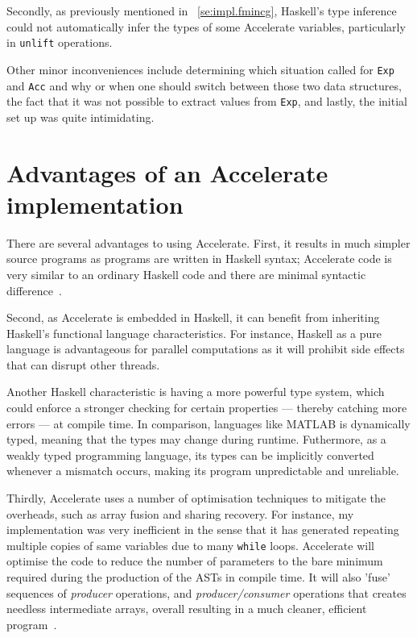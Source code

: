 Secondly, as previously mentioned in ~\ref{se:impl.fmincg}, Haskell's type inference could not automatically infer the types of some Accelerate variables, particularly in \texttt{unlift} operations. 

Other minor inconveniences include determining which situation called for \texttt{Exp} and \texttt{Acc} and why or when one should switch between those two data structures, the fact that it was not possible to extract values from \texttt{Exp}, and lastly, the initial set up was quite intimidating.

\section{Advantages of an Accelerate implementation} \label{se:eval.advantages}

There are several advantages to using Accelerate. First, it results in much simpler source programs as programs are written in Haskell syntax; Accelerate code is very similar to an ordinary Haskell code and there are minimal syntactic difference~\cite{Mar13}.

Second, as Accelerate is embedded in Haskell, it can benefit from inheriting Haskell's functional language characteristics. For instance, Haskell as a pure language is advantageous for parallel computations as it will prohibit side effects that can disrupt other threads.

Another Haskell characteristic is having a more powerful type system, which could enforce a stronger checking for certain properties --- thereby catching more errors --- at compile time. In comparison, languages like MATLAB is dynamically typed, meaning that the types may change during runtime. Futhermore, as a weakly typed programming language, its types can be implicitly converted whenever a mismatch occurs, making its program unpredictable and unreliable.

Thirdly, Accelerate uses a number of optimisation techniques to mitigate the overheads, such as array fusion and sharing recovery\cite{ChaKelLee11}. For instance, my implementation was very inefficient in the sense that it has generated repeating multiple copies of same variables due to many \texttt{while} loops. Accelerate will optimise the code to reduce the number of parameters to the bare minimum required during the production of the ASTs in compile time. It will also 'fuse' sequences of \textit{producer} operations, and \textit{producer/consumer} operations that creates needless intermediate arrays, overall resulting in a much cleaner, efficient program~\cite{McDChaGro}.

